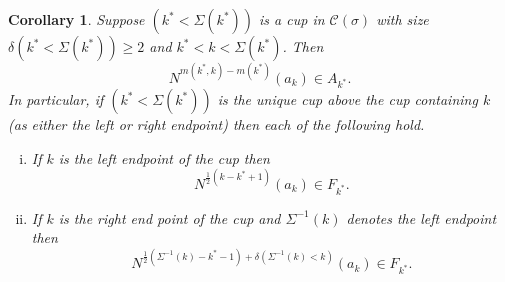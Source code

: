 \documentclass[11pt]{amsart}
\newtheorem{corollary}[theorem]{Corollary}
\theoremstyle{remark}
\theoremstyle{remark}
\theoremstyle{definition}
\theoremstyle{definition}
\theoremstyle{definition}
\numberwithin{equation}{section}
\newcommand{\gd}{\delta}
\newcommand{\gs}{\sigma}
\newcommand{\cc}{\mathcal{C}}
\newcommand{\E}{\Sigma}
\newcommand{\cupsigma}{\cc(\gs)}
\newcommand{\m}[2]{m(#1,#2)}
\newcommand{\mi}[1]{m(#1)}
\begin{document}
\begin{corollary} \label{cor.rank_condition} Suppose $(k^*<\E(k^*))$ is a cup in $\cupsigma$ with size $\gd(k^*<\E(k^*))\geq 2$ and $k^*<k< \E(k^*)$. Then 
\[
N^{\m{k^*}{k} - \mi{k^*}}(a_k)\in  A_{k^*}.
\]
In particular, if $(k^*<\E(k^*))$ is the unique cup above the cup containing $k$ (as either the left or right endpoint) then each of the following hold.
\begin{enumerate}[(i)]
\item \label{lem.rank.1} If $k$ is the left endpoint of the cup then
\[
N^{\frac{1}{2}(k-k^*+1)}(a_k) \in F_{k^*}.
\]
\item \label{lem.rank.2} If $k$ is the right end point of the cup and $\E^{-1}(k)$ denotes the left endpoint then 
\[
N^{\frac{1}{2}(\E^{-1}(k)-k^*-1)+\delta(\E^{-1}(k)<k)}(a_k) \in F_{k^*}.
\]
\end{enumerate}
\end{corollary}
\end{document}
